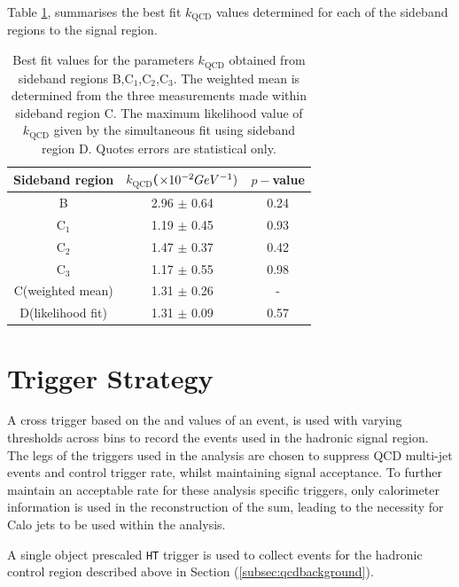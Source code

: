 Table \ref{tab:kqcdresults}, summarises the best fit $k_{\text{QCD}}$ values determined for each of the sideband regions to the signal region.

\begin{table}[h!]
\footnotesize
\begin{center}
\begin{tabular*}{0.6\textwidth}{@{\extracolsep{\fill}}ccc}
\hline
Sideband region & $k_{\text{QCD}}$($\times 10^{-2} GeV^{-1})$ & $p-$value\\ 
\hline\hline
B & 2.96 $\pm$ 0.64 & 0.24 \\
C$_{1}$ & 1.19 $\pm$ 0.45 & 0.93 \\
C$_{2}$ & 1.47 $\pm$ 0.37 & 0.42 \\
C$_{3}$ & 1.17 $\pm$ 0.55 & 0.98 \\
\cline{1-3}
C(weighted mean) & 1.31 $\pm$ 0.26 & - \\
D(likelihood fit) & 1.31 $\pm$ 0.09 & 0.57 \\
\end{tabular*}
\end{center}
\caption[Best fit values for the parameters $k_{\text{QCD}}$ obtained from sideband regions B,C$_{1}$,C$_{2}$,C$_{3}$. ]{Best fit values for the parameters $k_{\text{QCD}}$ obtained from sideband regions B,C$_{1}$,C$_{2}$,C$_{3}$. The weighted mean is determined from the three measurements made within sideband region C. The maximum likelihood value of $k_{\text{QCD}}$ given by the simultaneous fit using sideband region D. Quotes errors are statistical only. }
\label{tab:kqcdresults}
\end{table}


\section{Trigger Strategy}
\label{subsec:triggerstrategy}

A cross trigger based on the \theht and \alphat values of an event, is used with varying thresholds across \theht bins to record the events used in the hadronic signal region. The \alphat legs of the \htalphat triggers used in the analysis are chosen to suppress QCD multi-jet events and control trigger rate, whilst maintaining signal acceptance. To further maintain an acceptable rate for these analysis specific triggers, only calorimeter information is used in the reconstruction of the \theht sum, leading to the necessity for Calo jets to be used within the analysis. 

A single object prescaled \texttt{HT} trigger is used to collect events for the hadronic control region described above in Section (\ref{subsec:qcdbackground}).

